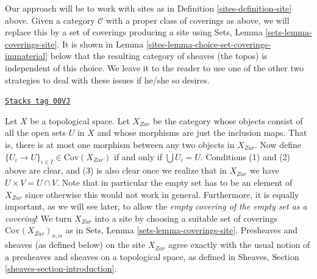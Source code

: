 \begin{remark}
\medskip\noindent
Our approach will be to work with sites as in Definition \ref{sites-definition-site}
above. Given a category $\mathcal{C}$ with a proper class of coverings
as above, we will replace this by a set of coverings producing a site using
Sets, Lemma \ref{sets-lemma-coverings-site}. It is shown in
Lemma \ref{sites-lemma-choice-set-coverings-immaterial} below that the resulting
category of sheaves (the topos) is independent of this choice. We leave it to
the reader to use one of the other two strategies to deal with these issues if
he/she so desires.
\end{remark}

\begin{example}
\label{sites-example-site-topological}
\href{https://stacks.math.columbia.edu/tag/00VJ}{\texttt{Stacks tag 00VJ}}

Let $X$ be a topological space. Let $X_{Zar}$ be the category whose
objects consist of all the open sets $U$ in $X$ and whose morphisms
are just the inclusion maps. That is, there is at most one morphism
between any two objects in $X_{Zar}$. Now define
$\{U_i \to U\}_{i \in I}\in \text{Cov}(X_{Zar})$ if
and only if $\bigcup U_i = U$.
Conditions (1) and (2) above are clear, and (3) is also
clear once we realize that in $X_{Zar}$ we have
$U \times V = U \cap V$. Note that in particular the empty
set has to be an element of $X_{Zar}$ since otherwise
this would not work in general. Furthermore, it is equally important,
as we will see later, to allow the {\it empty covering of the empty
set as a covering}!
We turn $X_{Zar}$ into a site
by choosing a suitable set of coverings
$\text{Cov}(X_{Zar})_{\kappa, \alpha}$ as in
Sets, Lemma \ref{sets-lemma-coverings-site}.
Presheaves and sheaves (as defined below)
on the site $X_{Zar}$ agree exactly with the usual notion of
a presheaves and sheaves on a topological space, as defined
in Sheaves, Section \ref{sheaves-section-introduction}.
\end{example}

